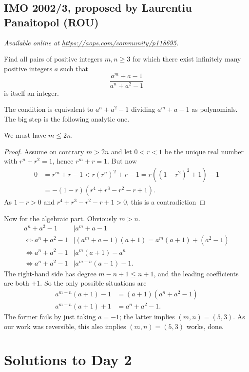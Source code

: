 \documentclass[11pt]{scrartcl}
\begin{document}
\subsection{IMO 2002/3, proposed by Laurentiu Panaitopol (ROU)}
\textsl{Available online at \url{https://aops.com/community/p118695}.}
\begin{mdframed}[style=mdpurplebox,frametitle={Problem statement}]
Find all pairs of positive integers
$m, n \ge 3$ for which there exist infinitely many
positive integers $a$ such that
\[ \frac{a^m+a-1}{a^n+a^2-1} \]
is itself an integer.
\end{mdframed}
The condition is equivalent to $a^n+a^2-1$
dividing $a^m+a-1$ as polynomials.
The big step is the following analytic one.

\begin{claim*}
  We must have $m \le 2n$.
\end{claim*}
\begin{proof}
  Assume on contrary $m > 2n$
  and let $0 < r < 1$ be the unique real number
  with $r^n+r^2 = 1$, hence $r^m+r = 1$.
  But now
  \begin{align*}
    0 &= r^m + r - 1 < r(r^n)^2 + r - 1 = r\left( (1-r^2)^2+1 \right) - 1 \\
    &= -(1-r)\left( r^4+r^3-r^2-r+1 \right).
  \end{align*}
  As $1-r > 0$ and $r^4+r^3-r^2-r+1 > 0$, this is a contradiction
\end{proof}

Now for the algebraic part.
Obviously $m > n$.
\begin{align*}
  a^n+a^2-1 &\mid a^m+a-1 \\
  \iff a^n+a^2-1 &\mid (a^m+a-1)(a+1) = a^m(a+1) + (a^2-1)  \\
  \iff a^n+a^2-1 &\mid a^m(a+1) - a^n \\
  \iff a^n+a^2-1 &\mid a^{m-n}(a+1) - 1.
\end{align*}
The right-hand side has degree $m-n+1 \le n+1$,
and the leading coefficients are both $+1$.
So the only possible situations are
\begin{align*}
  a^{m-n}(a+1) - 1 &= (a+1)\left( a^n+a^2-1 \right) \\
  a^{m-n}(a+1) + 1 &=  a^n+a^2-1.
\end{align*}
The former fails by just taking $a=-1$;
the latter implies $(m,n) = (5,3)$.
As our work was reversible, this also implies $(m,n) = (5,3)$ works, done.
\pagebreak

\section{Solutions to Day 2}
\end{document}
